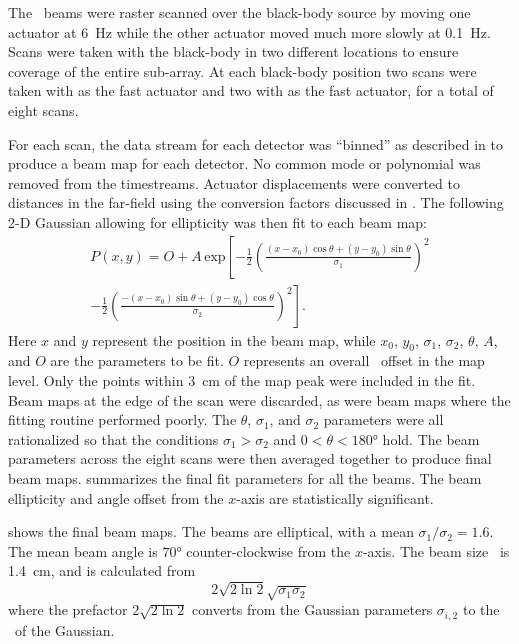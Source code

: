 The \Imager\ beams were raster scanned over the black-body source by moving one actuator at \SI{6}{\hertz} while the other actuator moved much more slowly at \SI{0.1}{\hertz}.
Scans were taken with the black-body in two different locations to ensure coverage of the entire sub-array.
At each black-body position two scans were taken with  as the fast actuator and two with  as the fast actuator, for a total of eight scans.

For each scan, the data stream for each detector was ``binned'' as described in  to produce a beam map for each detector.
No common mode or polynomial was removed from the timestreams.
Actuator displacements were converted to distances in the far-field using the conversion factors discussed in .
The following 2-D Gaussian allowing for ellipticity was then fit to each beam map:
\begin{multline}
  P(x,y) = O + A \, \text{exp} \left[  - \frac{1}{2} \left( \frac{ (x-x_0) \cos{\theta} + (y-y_0) \sin{\theta}}{\sigma_1} \right)^2 \right. \\ 
                              \left. - \frac{1}{2} \left( \frac{-(x-x_0) \sin{\theta} + (y-y_0) \cos{\theta}}{\sigma_2} \right)^2
                       \right] .
\end{multline}
Here $x$ and $y$ represent the position in the beam map, while $x_0$, $y_0$, $\sigma_1$, $\sigma_2$, $\theta$, $A$, and $O$ are the parameters to be fit.
$O$ represents an overall \DC\ offset in the map level.
Only the points within \SI{3}{\cm} of the map peak were included in the fit.
Beam maps at the edge of the scan were discarded, as were beam maps where the fitting routine performed poorly. %
The $\theta$, $\sigma_1$, and $\sigma_2$ parameters were all rationalized so that the conditions $\sigma_1 > \sigma_2$ and $0 < \theta < \ang{180}$ hold.
The beam parameters across the eight scans were then averaged together to produce final beam maps.
 summarizes the final fit parameters for all the beams.
The beam ellipticity and angle offset from the $x$-axis are statistically significant.

 shows the final beam maps.
The beams are elliptical, with a mean $\sigma_1 / \sigma_2 = 1.6$.
The mean beam angle is $\ang{70}$ counter-clockwise from the $x$-axis.
The beam size \FWHM\ is \SI{1.4}{\cm}, and is calculated from
\begin{equation}
  2 \sqrt{2 \ln{2}} \sqrt{\sigma_1 \sigma_2}
\end{equation}
where the prefactor $2 \sqrt{2 \ln{2}}$ converts from the Gaussian parameters $\sigma_{i,2}$ to the \FWHM\ of the Gaussian.

